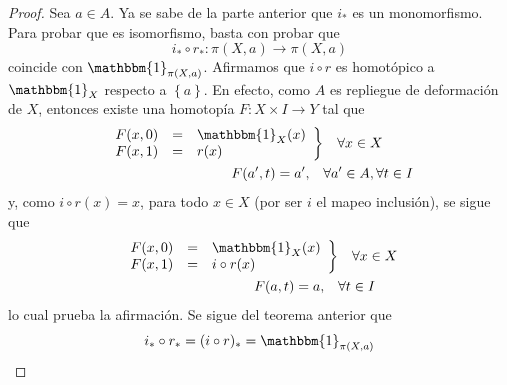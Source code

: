 \documentclass[12pt]{report}
\theoremstyle{largebreak}
\newcommand\cf[3]{\ensuremath{#1:#2\rightarrow#3}}
\newcommand{\bbm}[1]{\ensuremath{\mathbbm{#1}}}
\begin{document}
    \begin{proof}
        Sea $a\in A$. Ya se sabe de la parte anterior que $i_*$ es un monomorfismo. Para probar que es isomorfismo, basta con probar que
        \begin{equation*}
            \cf{i_*\circ r_*}{\pi(X,a)}{\pi(X,a)}
        \end{equation*}
        coincide con $\bbm{1}_{\pi(X,a)}$. Afirmamos que $i\circ r$ es homotópico a $\bbm{1}_X$ respecto a $\left\{a\right\}$. En efecto, como $A$ es repliegue de deformación de $X$, entonces existe una homotopía $\cf{F}{X\times I}{Y}$ tal que
        \begin{equation*}
            \begin{split}
                \left.
                \begin{array}{rcl}
                    F(x,0) & = & \bbm{1}_X(x)\\
                    F(x,1) & = & r(x)\\
                \end{array}
            \right\} & \quad\forall x\in X\\
            F(a',t)=a',\quad&\forall a'\in A, \forall t\in I\\
            \end{split}
        \end{equation*}
        y, como $i\circ r(x)=x$, para todo $x\in X$ (por ser $i$ el mapeo inclusión), se sigue que
        \begin{equation*}
            \begin{split}
                \left.
                \begin{array}{rcl}
                    F(x,0) & = & \bbm{1}_X(x)\\
                    F(x,1) & = & i\circ r(x)\\
                \end{array}
            \right\} & \quad\forall x\in X\\
            F(a,t)=a,\quad&\forall t\in I\\
            \end{split}
        \end{equation*}
        lo cual prueba la afirmación. Se sigue del teorema anterior que
        \begin{equation*}
            i_*\circ r_*=(i\circ r)_*=\bbm{1}_{\pi(X,a)}
        \end{equation*}
    \end{proof}
\end{document}
